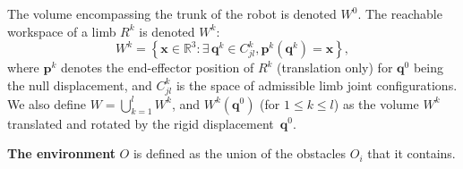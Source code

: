 \medskip
The volume encompassing the trunk of the robot is denoted $W^0$.
 The reachable workspace of a limb $R^k$ is denoted $W^k$: %
\begin{equation}
  W^k = \left\{ {\mathbf{x} \in \mathbb{R}^3: \exists \, \mathbf{q}^k \in C^k_{jl}, \mathbf{p}^k(\mathbf{q}^k) = \mathbf{x} } \right\},
\end{equation}
where $\mathbf{p}^k$ denotes the end-effector position of $R^k$ (translation only) for $\mathbf{q}^0$ being the null displacement, and  $C^k_{jl}$ is the space
of admissible limb joint configurations. We also define $W = \bigcup_{k=1}^{l}W^k$, and
$W^k(\mathbf{q}^{0})$ (for $1 \leq k \leq l$) as the volume $W^k$ translated and rotated by the rigid displacement~$\mathbf{q}^{0}$.

\medskip
\textbf{The environment} $O$ is defined as the union of the obstacles $O_i$ that it contains.
